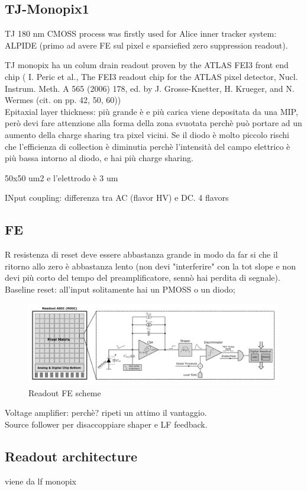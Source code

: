 
\label{Monopix1}
\begin{titlepage}

\section{TJ-Monopix1}

TJ 180 nm CMOSS process was firstly used for Alice inner tracker system: ALPIDE
(primo ad avere FE sul pixel e sparsiefied zero suppression readout).

TJ monopix ha un colum drain readout proven by the ATLAS FEI3 front end chip (
I. Peric et al., The FEI3 readout chip for the ATLAS pixel detector,
Nucl. Instrum. Meth. A 565 (2006) 178, ed. by J. Grosse-Knetter, H. Krueger, and N. Wermes
(cit. on pp. 42, 50, 60))\\

Epitaxial layer thickness: più grande è e più carica viene depositata da una MIP,
però devi fare attenzione alla forma della zona svuotata perchè può portare ad un
aumento della charge sharing tra pixel vicini.
Se il diodo è molto piccolo rischi che l'efficienza di collection è diminutia perchè
l'intensità del campo elettrico è più bassa intorno al diodo, e hai più charge sharing.

50x50 um2 e l'elettrodo è 3 um

INput coupling: differenza tra AC (flavor HV) e DC. 4 flavors\\



\subsection{FE}
R resistenza di reset deve essere abbastanza grande in modo da far si che il
ritorno allo zero è abbastanza lento (non devi "interferire" con la tot slope
e non devi più corto del tempo del preamplificatore, sennò hai perdita di segnale).\\
Baseline reset: all'input solitamente hai un PMOSS o un diodo;  


\begin{figure}
    \centering\includegraphics[width=15cm]{figures/readout_scheme.png}
    \caption{Readout FE scheme}
    \label{fig:readout_scheme}
    \end{figure}
Voltage amplifier: perchè? ripeti un attimo il vantaggio. \\
Source follower per disaccoppiare shaper e LF feedback.\\

\subsection{Readout architecture}
viene da lf monopix\\
\end{titlepage}
